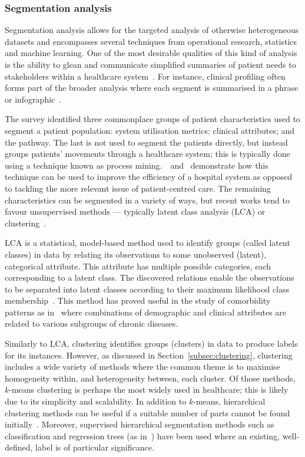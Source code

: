 \subsubsection{Segmentation analysis}

Segmentation analysis allows for the targeted analysis of otherwise
heterogeneous datasets and encompasses several techniques from operational
research, statistics and machine learning. One of the most desirable qualities
of this kind of analysis is the ability to glean and communicate simplified
summaries of patient needs to stakeholders within a healthcare
system~\cite{Vuik2016b, Yoon2020}. For instance, clinical profiling often forms
part of the broader analysis where each segment is summarised in a phrase or
infographic~\cite{Vuik2016a,Yan2019}.

The survey identified three commonplace groups of patient characteristics used
to segment a patient population: system utilisation metrics; clinical
attributes; and the pathway. The last is not used to segment the patients
directly, but instead groups patients' movements through a healthcare system;
this is typically done using a technique known as process
mining.~\cite{Arnolds2018}~and~\cite{Delias2015} demonstrate how this technique
can be used to improve the efficiency of a hospital system as opposed to
tackling the more relevant issue of patient-centred care. The remaining
characteristics can be segmented in a variety of ways, but recent works tend to
favour unsupervised methods --- typically latent class analysis (LCA) or
clustering~\cite{Yan2018}.

LCA is a statistical, model-based method used to identify groups (called latent
classes) in data by relating its observations to some unobserved (latent),
categorical attribute. This attribute has multiple possible categories, each
corresponding to a latent class. The discovered relations enable the
observations to be separated into latent classes according to their maximum
likelihood class membership~\cite{Hagenaars2002,Lazarsfeld1968}. This method has
proved useful in the study of comorbidity patterns as
in~\cite{Kuwornu2014,Larsen2017} where combinations of demographic and clinical
attributes are related to various subgroups of chronic diseases.

Similarly to LCA, clustering identifies groups (clusters) in data to produce
labels for its instances. However, as discussed in
Section~\ref{subsec:clustering}, clustering includes a wide variety of methods
where the common theme is to maximise homogeneity within, and heterogeneity
between, each cluster. Of those methods, \(k\)-means clustering is perhaps the
most widely used in healthcare; this is likely due to its simplicity and
scalability. In addition to \(k\)-means, hierarchical clustering methods can be
useful if a suitable number of parts cannot be found initially~\cite{Vuik2016a}.
Moreover, supervised hierarchical segmentation methods such as classification
and regression trees (as in~\cite{Harper2006}) have been used where an existing,
well-defined, label is of particular significance.

